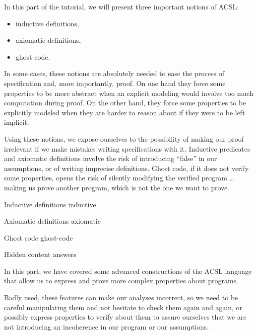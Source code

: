 In this part of the tutorial, we will present three important notions of ACSL:
\begin{itemize}
\item inductive definitions,
\item axiomatic definitions,
\item ghost code.
\end{itemize}


In some cases, these notions are absolutely needed to ease the process of
specification and, more importantly, proof. On one hand they force some
properties to be more abstract when an explicit modeling would involve too much
computation during proof. On the other hand, they force some properties to be
explicitly modeled when they are harder to reason about if they were
to be left implicit.

Using these notions, we expose ourselves to the possibility of making our
proof irrelevant if we make mistakes writing specifications with it. Inductive
predicates and axiomatic definitions involve the risk of introducing ``false'' in
our assumptions, or of writing imprecise definitions. Ghost code, if it does not
verify some properties, opens the risk of silently modifying the verified program
\ldots{} making us prove another program, which is not the one we want to prove.


\begin{levelTwo}
  {Inductive definitions}
  {inductive}
\end{levelTwo}

\begin{levelTwo}
  {Axiomatic definitions}
  {axiomatic}
\end{levelTwo}

\begin{levelTwo}
  {Ghost code}
  {ghost-code}
\end{levelTwo}

\begin{levelTwo}
  {Hidden content}
  {answers}
\end{levelTwo}


\horizontalLine
\newpage


In this part, we have covered some advanced constructions of the ACSL
language that allow us to express and prove more complex properties about
programs.

Badly used, these features can make our analyses incorrect, so we need
to be careful manipulating them and not hesitate to check them again and
again, or possibly express properties to verify about them to assure ourselves
that we are not introducing an incoherence in our program or our
assumptions.
